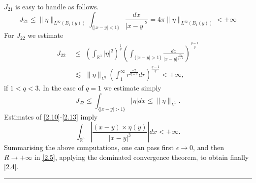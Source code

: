 \documentclass[12pt]{article}
\numberwithin{equation}{section}
\theoremstyle{definition}
\begin{document}
$J_{21}$ is easy to handle as follows.
\begin{equation}\label{2.11}
J_{21}\leq\|\eta\|_{L^{\infty}(B_1(y))}\int_{\{|x-y|<1\}}\frac{dx}{|x-y|^2}=4\pi\|\eta\|_{L^{\infty}(B_1(y))}<+\infty
\end{equation}
For $J_{22}$ we estimate
\begin{align}\label{2.12}
J_{22}\,\,&\leq\,\,\left(\int_{\mathbb{R}^3}|\eta|^q\right)^{\frac{1}{q}}
  \left(\int_{\{|x-y|>1\}}\frac{dx}{|x-y|^{\frac{2q}{q-1}}}\right)^{\frac{q-1}{q}}\nonumber\\
  & \lesssim \,\,\|\eta\|_{L^q}\left(\int_{1}^{\infty}r^{\frac{-2}{q-1}}dr\right)^{\frac{q-1}{q}}<+\infty,
\end{align}
if $1<q<3$. In the case of $q=1$ we estimate simply
\begin{equation}\label{2.13}
J_{22}\leq\int_{\{|x-y|>1\}}|\eta|dx \leq \|\eta\|_{L^1}.
\end{equation}
Estimates of \eqref{2.10}-\eqref{2.13} imply
$$\int_{\mathbb{R}^3}\left|\frac{(x-y)\times\eta(y)}{|x-y|^3}\right| dx<+\infty.$$
Summarising the above computations, one can pass first $\epsilon\rightarrow0$, and then $R\rightarrow+\infty$ in \eqref{2.5},
applying the dominated convergence theorem, to obtain finally \eqref{2.4}.  \hfill {\rule{0.2cm}{0.2cm}} \\
\end{document}
